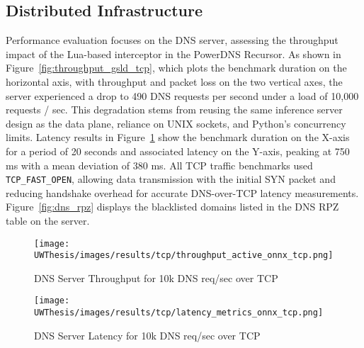 \documentclass [11pt, proquest] {uwthesis}[2020/02/24]
\begin{document}
\subsection{Distributed Infrastructure}
Performance evaluation focuses on the DNS server, assessing the throughput impact of the Lua-based interceptor in the PowerDNS Recursor. As shown in Figure~\ref{fig:throughput_gsld_tcp}, which plots the benchmark duration on the horizontal axis, with throughput and packet loss on the two vertical axes, the server experienced a drop to 490 DNS requests per second under a load of 10,000 requests / sec. This degradation stems from reusing the same inference server design as the data plane, reliance on UNIX sockets, and Python’s concurrency limits. Latency results in Figure~\ref{fig:throughput_onnx_tcp} show the benchmark duration on the X-axis for a period of 20 seconds and associated latency on the Y-axis, peaking at 750 ms with a mean deviation of 380 ms. All TCP traffic benchmarks used \texttt{TCP\_FAST\_OPEN}, allowing data transmission with the initial SYN packet and reducing handshake overhead for accurate DNS-over-TCP latency measurements. 
Figure~\ref{fig:dns_rpz} displays the blacklisted domains listed in the DNS RPZ table on the server.



\begin{figure}[H]
  \centering
  \begin{minipage}[t]{0.48\textwidth}
    \centering
    \texttt{[image: UWThesis/images/results/tcp/throughput\_active\_onnx\_tcp.png]}
    \caption{DNS Server Throughput for 10k DNS req/sec over TCP}
    \label{fig:throughput_gsld_tcp}
  \end{minipage}
  \hfill
  \begin{minipage}[t]{0.48\textwidth}
    \centering
    \texttt{[image: UWThesis/images/results/tcp/latency\_metrics\_onnx\_tcp.png]}
    \caption{DNS Server Latency for 10k DNS req/sec over TCP}
    \label{fig:throughput_onnx_tcp}
  \end{minipage}
\end{figure}
\end{document}
